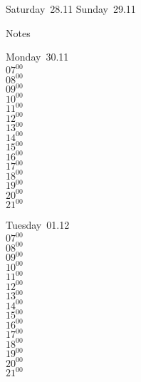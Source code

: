 \documentclass[11pt,a4paper]{book}\usepackage[]{graphicx}\usepackage[]{color}
\begin{document}
\begin{weekendbox}
  Saturday~28.11
  \tcblower
  Sunday~29.11
\end{weekendbox} %
\begin{notebox}
  Notes
\end{notebox}
\clearpage
\begin{headerbox}
\end{headerbox}
\begin{weekdaybox}
  Monday~30.11\\
  { 
  \vfill
  $07^{00}$\\
$08^{00}$\\
$09^{00}$\\
$10^{00}$\\
$11^{00}$\\
$12^{00}$\\
$13^{00}$\\
$14^{00}$\\
$15^{00}$\\
$16^{00}$\\
$17^{00}$\\
$18^{00}$\\
$19^{00}$\\
$20^{00}$\\
$21^{00}$\\
  }
\end{weekdaybox}
\begin{weekdaybox}
  Tuesday~01.12\\
  { 
  \vfill
  $07^{00}$\\
$08^{00}$\\
$09^{00}$\\
$10^{00}$\\
$11^{00}$\\
$12^{00}$\\
$13^{00}$\\
$14^{00}$\\
$15^{00}$\\
$16^{00}$\\
$17^{00}$\\
$18^{00}$\\
$19^{00}$\\
$20^{00}$\\
$21^{00}$\\
  }
\end{weekdaybox}
\end{document}
